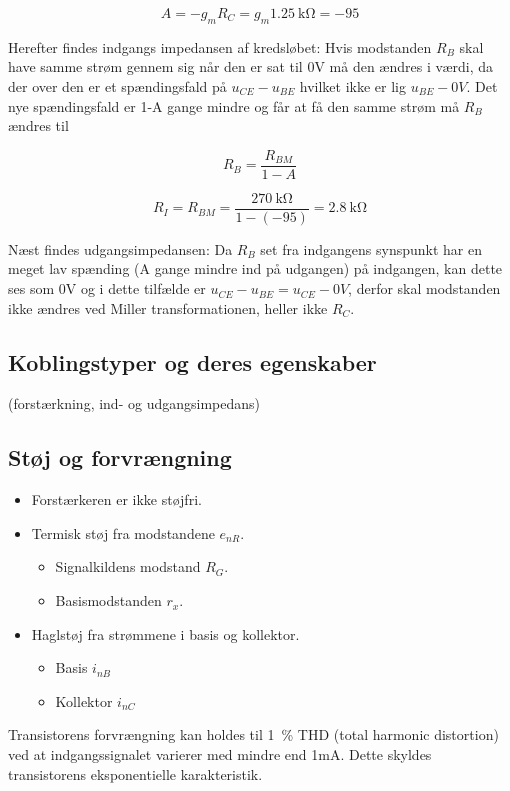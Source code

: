 \documentclass[danish]{article}
\begin{document}
\begin{equation} 
A = -g_m R_C = g_m \SI{1.25}{\kilo\ohm} = -95
\end{equation}

Herefter findes indgangs impedansen af kredsløbet:
Hvis modstanden $R_B$ skal have samme strøm gennem sig når den er sat til 0V må den ændres i værdi, da der over den er et spændingsfald på
$u_{CE}-u_{BE}$ hvilket ikke er lig $u_{BE}-0V$. Det nye spændingsfald er 1-A gange mindre og får at få den samme strøm må $R_B$ ændres til

\begin{equation} 
R_B = \dfrac{R_{BM}}{1-A}
\end{equation}

\begin{equation} 
R_I = R_{BM} = \dfrac{\SI{270}{\kilo\ohm}}{1-(-95)} = \SI{2.8}{\kilo\ohm}
\end{equation}

Næst findes udgangsimpedansen:
Da $R_B$ set fra indgangens synspunkt har en meget lav spænding (A gange mindre ind på udgangen) på indgangen, kan dette ses som 0V og i dette tilfælde er $u_{CE}-u_{BE} = u_{CE}-0V$, derfor skal modstanden ikke ændres ved Miller transformationen, heller ikke $R_C$. 

\subsection{Koblingstyper og deres egenskaber}
(forstærkning, ind- og udgangsimpedans)

\subsection{Støj og forvrængning}
\begin{itemize}
	\item Forstærkeren er ikke støjfri.
	\item Termisk støj fra modstandene $e_{nR}$.
	\begin{itemize}
		\item Signalkildens modstand $R_G$.
		\item Basismodstanden $r_x$.
	\end{itemize}
	\item Haglstøj fra strømmene i basis og kollektor.
	\begin{itemize}
		\item Basis $i_{nB}$
		\item Kollektor $i_{nC}$
	\end{itemize}
\end{itemize}

Transistorens forvrængning kan holdes til \SI{1}{\percent} THD (total harmonic distortion) ved at indgangssignalet varierer med mindre end 1mA. Dette skyldes transistorens eksponentielle karakteristik.
\end{document}
